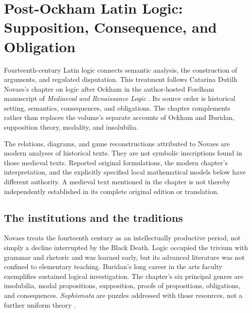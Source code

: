 \chapter{Post-Ockham Latin Logic: Supposition, Consequence, and Obligation}
\label{sec:p13-medieval-latin-inference}

Fourteenth-century Latin logic connects semantic analysis, the construction
of arguments, and regulated disputation. This treatment follows Catarina
Dutilh Novaes's chapter on logic after Ockham in the author-hosted Fordham
manuscript of \emph{Mediaeval and Renaissance Logic}
\cite[pp.~433--504]{DutilhNovaes2007FordhamChapter8}. Its source order is
historical setting, semantics, consequences, and obligations.
The chapter complements rather than replaces the volume's separate accounts
of Ockham and Buridan, supposition theory, modality, and insolubilia.

The relations, diagrams, and game reconstructions attributed to Novaes
are modern analyses of historical texts. They are not symbolic inscriptions
found in those medieval texts. Reported original formulations, the modern
chapter's interpretation, and the explicitly specified local mathematical
models below have different authority. A medieval text mentioned in the
chapter is not thereby independently established in its complete original
edition or translation.

\section{The institutions and the traditions}
\label{sec:p13-latin-traditions}

Novaes treats the fourteenth century as an intellectually productive period,
not simply a decline interrupted by the Black Death. Logic occupied the
trivium with grammar and rhetoric and was learned early, but its advanced
literature was not confined to elementary teaching. Buridan's long career
in the arts faculty exemplifies sustained logical investigation.
The chapter's six principal genres are insolubilia, modal propositions,
supposition, proofs of propositions, obligations, and consequences.
\emph{Sophismata} are puzzles addressed with those resources, not a further
uniform theory \cite[pp.~433--435]{DutilhNovaes2007FordhamChapter8}.

